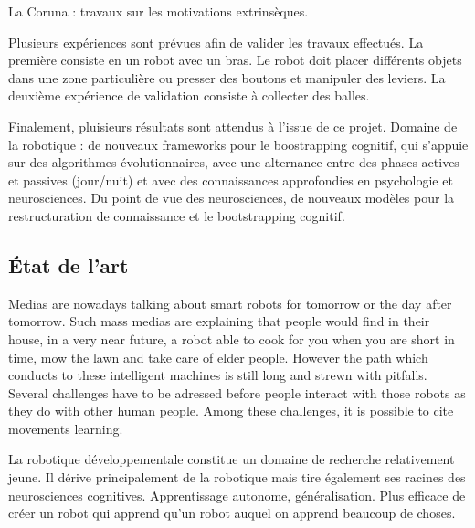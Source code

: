 \documentclass{llncs}
\begin{document}
La Coruna : travaux sur les motivations extrinsèques.

Plusieurs expériences sont prévues afin de valider les travaux effectués. La première consiste en un robot avec un bras. Le robot doit placer différents objets dans une zone particulière ou presser des boutons et manipuler des leviers. La deuxième expérience de validation consiste à collecter des balles.

Finalement, pluisieurs résultats sont attendus à l'issue de ce projet. Domaine de la robotique : de nouveaux frameworks pour le boostrapping cognitif, qui s'appuie sur des algorithmes évolutionnaires, avec une alternance entre des phases actives et passives (jour/nuit) et avec des connaissances approfondies en psychologie et neurosciences. Du point de vue des neurosciences, de nouveaux modèles pour la restructuration de connaissance et le bootstrapping cognitif.





\subsection{\'Etat de l'art}

Medias are nowadays talking about smart robots for tomorrow or the day after tomorrow. Such mass medias are explaining that people would find in their house, in a very near future,  a robot able to cook for you when you are short in time, mow the lawn and take care of elder people. However the path which conducts to these intelligent machines is still long and strewn with pitfalls. Several challenges have to be adressed before people interact with those robots as they do with other human people. Among these challenges, it is possible to cite movements learning.


La robotique développementale constitue un domaine de recherche relativement jeune. Il dérive principalement de la robotique mais tire également ses racines des neurosciences cognitives.
Apprentissage autonome, généralisation.
Plus efficace de créer un robot qui apprend qu'un robot auquel on apprend beaucoup de choses.





\end{document}
